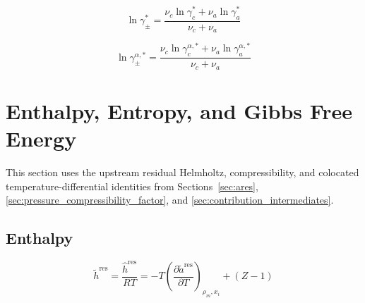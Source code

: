 \documentclass[12pt, letterpaper]{article}
\begin{document}
\begin{equation}
    \ln\gamma_{\pm}^{*}
    =
    \frac{\nu_{c}\ln\gamma_{c}^{*}+\nu_{a}\ln\gamma_{a}^{*}}{\nu_{c}+\nu_{a}}
    \label{eq:lngamma_pm_asym}
\end{equation}


\begin{equation}
    \ln\gamma_{\pm}^{\alpha,*}
    =
    \frac{\nu_{c}\ln\gamma_{c}^{\alpha,*}+\nu_{a}\ln\gamma_{a}^{\alpha,*}}{\nu_{c}+\nu_{a}}
    \label{eq:lngamma_pm_alpha_asym}
\end{equation}


\section{Enthalpy, Entropy, and Gibbs Free Energy}
\label{sec:thermo_derived_properties}

This section uses the upstream residual Helmholtz, compressibility, and colocated temperature-differential identities from Sections~\ref{sec:ares}, \ref{sec:pressure_compressibility_factor}, and \ref{sec:contribution_intermediates}.

\subsection{Enthalpy}


\begin{equation}
    \tilde{h}^{\mathrm{res}} = \frac{\hat{h}^{\mathrm{res}}}{RT}=-T\left(\frac{\partial\tilde{a}^{\mathrm{res}}}{\partial T}\right)_{\rho_m,x_{i}}+(Z-1)
    \label{eq:h_res}
\end{equation}
\end{document}
